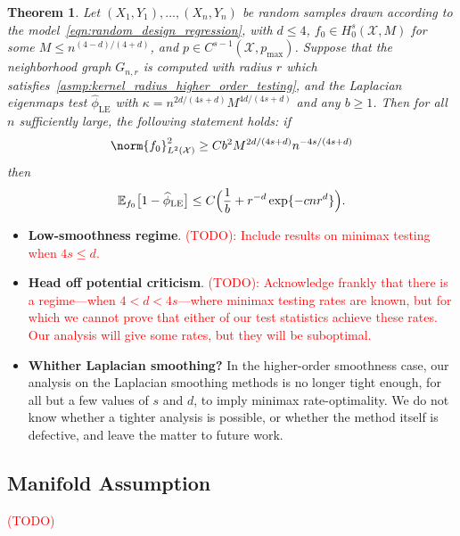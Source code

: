 \documentclass{article}
\newcommand{\1}{\mathbf{1}}
\newcommand{\Xset}{\mathcal{X}}
\newcommand{\Leb}{L}
\newcommand{\Ebb}{\mathbb{E}}
\newcommand{\wh}[1]{\widehat{#1}}
\newcommand{\LE}{\mathrm{LE}}
\theoremstyle{alden}
\theoremstyle{aldenthm}
\newtheorem{theorem}{Theorem}
\theoremstyle{definition}
\theoremstyle{remark}
\begin{document}
\begin{theorem}
	\label{thm:laplacian_eigenmaps_testing_higher_order}
	Let $(X_1,Y_1),\ldots,(X_n,Y_n)$ be random samples drawn according to the model~\eqref{eqn:random_design_regression}, with $d \leq 4$, $f_0 \in H_0^s(\Xset,M)$ for some $M \leq n^{(4 - d)/(4 + d)}$, and $p \in C^{s - 1}(\Xset,p_{\max})$. Suppose that the neighborhood graph $G_{n,r}$ is computed with radius $r$ which satisfies~\ref{asmp:kernel_radius_higher_order_testing}, and the Laplacian eigenmaps test $\wh{\phi}_{\LE}$ with $\kappa = n^{2d/(4s + d)} M^{4d/(4s + d)}$ and any $b \geq 1$. Then for all $n$ sufficiently large, the following statement holds: if
	\begin{equation}
	\label{eqn:laplacian_eigenmaps_testing}
	\norm{f_0}_{\Leb^2(\Xset)}^2 \geq C b^2 M^{2d/(4s + d)} n^{-4s/(4s + d)}
	\end{equation}
	then
	\begin{equation*}
	\Ebb_{f_0}\bigl[1 - \wh{\phi}_{\LE}\bigr] \leq C \Bigl(\frac{1}{b} + r^{-d} \exp\{- c n r^d\}\Bigr).
	\end{equation*}
\end{theorem}

\begin{itemize}
	\item \textbf{Low-smoothness regime}. \textcolor{red}{(TODO): Include results on minimax testing when $4s \leq d$.}
	\item \textbf{Head off potential criticism}. \textcolor{red}{(TODO): Acknowledge frankly that there is a regime---when $4 < d < 4s$---where minimax testing rates are known, but for which we cannot prove that either of our test statistics achieve these rates. Our analysis will give some rates, but they will be suboptimal.}
	\item \textbf{Whither Laplacian smoothing?} In the higher-order smoothness case, our analysis on the Laplacian smoothing methods is no longer tight enough, for all but a few values of $s$ and $d$, to imply minimax rate-optimality. We do not know whether a tighter analysis is possible, or whether the method itself is defective, and leave the matter to future work.
\end{itemize}

\subsection{Manifold Assumption}
\label{subsec:manifold_assumption}

\textcolor{red}{(TODO)}
\end{document}

